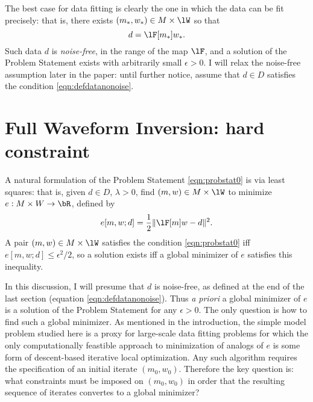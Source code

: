 The best case for data fitting
is clearly the one in which the data can be fit precisely: that is,
there exists $(m_*,w_*) \in M\times \lW$ so that
\begin{equation}
  \label{eqn:defdatanonoise}
  d=\lF[m_*]w_*.
\end{equation}
Such data $d$ is {\em noise-free}, in the range of the map $\lF$, and a solution of the Problem Statement
exists with arbitrarily small $\epsilon>0$. I will relax the noise-free assumption
later in the paper: until further notice, assume that $d \in
D$ satisfies the condition \ref{eqn:defdatanonoise}.

\section{Full Waveform Inversion: hard constraint}
A natural formulation of the Problem Statement \ref{eqn:probstat0} is
via least squares: that is, given $d \in D$, $\lambda >0$, find $(m,w)
\in M \times \lW$ to minimize $e: M \times W
 \rightarrow \bR$, defined by
\begin{equation}
  \label{eqn:FWI}
  e[m,w;d] = \frac{1}{2}\|\lF[m]w-d\|^2.
\end{equation}
A pair $(m,w) \in M\times \lW$
satisfies the condition \ref{eqn:probstat0} iff $e[m,w;d] \le \epsilon^2/2$, so a solution exists iff a 
global minimizer of $e$ satisfies this inequality.

In this discussion, I will presume that $d$ is 
noise-free, as defined at the end of the last section (equation
\ref{eqn:defdatanonoise}). Thus {\em a priori} a global minimizer of
$e$ is a solution of the Problem Statement for any
$\epsilon > 0$. The only
question is how to find such a global minimizer. As mentioned in the
introduction, the simple model problem studied here is a proxy for
large-scale data fitting problems for which the only computationally
feastible approach to minimization of analogs of $e$
is some form of descent-based iterative local optimization. Any such
algorithm requires the specification of an initial iterate
$(m_0,w_0)$. Therefore the key question is: what
constraints must be imposed on $(m_0,w_0)$ in order that the resulting
sequence of iterates convertes to a global minimizer?  

